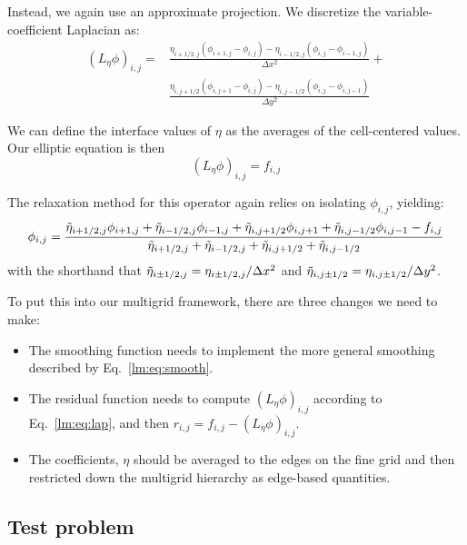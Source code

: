 
Instead, we again use an approximate projection.  We discretize the
variable-coefficient Laplacian as:
\begin{align}
(L_\eta \phi)_{i,j} = 
 & \frac{\eta_{i+1/2,j} (\phi_{i+1,j} - \phi_{i,j}) -
        \eta_{i-1/2,j} (\phi_{i,j} - \phi_{i-1,j})}{\Delta x^2} + \nonumber \\
 & \frac{\eta_{i,j+1/2} (\phi_{i,j+1} - \phi_{i,j}) -
        \eta_{i,j-1/2} (\phi_{i,j} - \phi_{i,j-1})}{\Delta y^2}
\label{lm:eq:lap}
\end{align}

We can define the interface values of $\eta$ as the averages of the
cell-centered values.  Our elliptic equation is then 
\begin{equation}
(L_\eta \phi)_{i,j} = f_{i,j}
\end{equation}

The relaxation method for this operator again relies on isolating
$\phi_{i,j}$, yielding:
\begin{equation}
\phi_{i,j} = \frac{\tilde{\eta}_{i+1/2,j}\phi_{i+1,j} + \tilde{\eta}_{i-1/2,j}\phi_{i-1,j} +
                   \tilde{\eta}_{i,j+1/2}\phi_{i,j+1} + \tilde{\eta}_{i,j-1/2}\phi_{i,j-1} -
                   f_{i,j} } 
                  {\tilde{\eta}_{i+1/2,j} + \tilde{\eta}_{i-1/2,j} + 
                   \tilde{\eta}_{i,j+1/2} + \tilde{\eta}_{i,j-1/2}}
\label{lm:eq:smooth}
\end{equation}
with the shorthand that $\tilde{\eta}_{i\pm1/2,j} = \eta_{i\pm1/2,j}/\Delta x^2$
and $\tilde{\eta}_{i,j\pm1/2} = \eta_{i,j\pm1/2}/\Delta y^2$.

To put this into our multigrid framework, there are three changes we
need to make:
\begin{itemize}
\item The smoothing function needs to implement the more general smoothing
described by Eq.~\ref{lm:eq:smooth}.

\item The residual function needs to compute $(L_\eta \phi)_{i,j}$ according
to Eq.~\ref{lm:eq:lap}, and then $r_{i,j} = f_{i,j} - (L_\eta \phi)_{i,j}$.

\item The coefficients, $\eta$ should be averaged to the edges on the fine
grid and then restricted down the multigrid hierarchy as edge-based 
quantities.
\end{itemize}

\subsection{Test problem}

